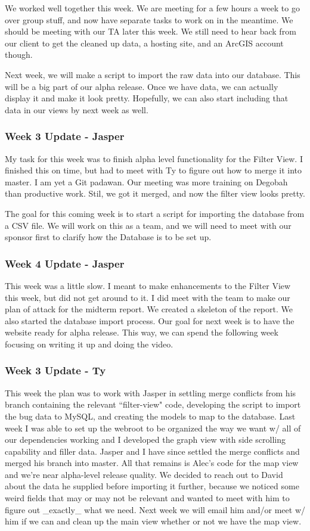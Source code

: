 We worked well together this week.
We are meeting for a few hours a week to go over group stuff, and now have separate tasks to work on in the meantime.
We should be meeting with our TA later this week.
We still need to hear back from our client to get the cleaned up data, a hosting site, and an ArcGIS account though.

Next week, we will make  a script to import the raw data into our database.
This will be a big part of our alpha release.
Once we have data, we can actually display it and make it look pretty.
Hopefully, we can also start including that data in our views by next week as well.

\subsubsection{Week 3 Update - Jasper}
My task for this week was to finish alpha level functionality for the Filter View.
I finished this on time, but had to meet with Ty to figure out how to merge it into master.
I am yet a Git padawan.
Our meeting was more training on Degobah than productive work.
Stil, we got it merged, and now the filter view looks pretty.

The goal for this coming week is to start a script for importing the database from a CSV file.
We will work on this as a team, and we will need to meet with our sponsor first to clarify how the Database is to be set up.

\subsubsection{Week 4 Update - Jasper}
This week was a little slow.
I meant to make enhancements to the Filter View this week, but did not get around to it.
I did meet with the team to make our plan of attack for the midterm report.
We created a skeleton of the report.
We also started the database import process.
Our goal for next week is to have the website ready for alpha release.
This way, we can spend the following week focusing on writing it up and doing the video.​

\subsubsection{Week 3 Update - Ty}
This week the plan was to work with Jasper in settling merge conflicts from his branch containing the relevant ``filter-view" code, developing the script to import the bug data to MySQL​, and creating the models to map to the database.
Last week I was able to set up the webroot to be organized the way we want w/ all of our dependencies working and I developed the graph view with side scrolling capability and filler data.
Jasper and I have since settled the merge conflicts and merged his branch into master.
All that remains is Alec's code for the map view and we're near alpha-level release quality.
We decided to reach out to David about the data he supplied before importing it further, because we noticed some weird fields that may or may not be relevant and wanted to meet with him to figure out _exactly_ what we need.
Next week we will email him and/or meet w/ him if we can and clean up the main view whether or not we have the map view.

